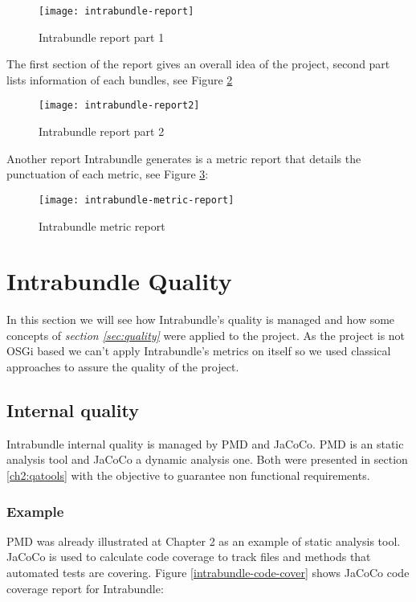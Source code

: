 \begin{figure}[h]
\caption{Intrabundle report part 1}
\label{intrabundle-report1}
\centering
\texttt{[image: intrabundle-report]}
\end{figure}  
\FloatBarrier

The first section of the report gives an overall idea of the project, second part lists information of each bundles, see Figure \ref{intrabundle-report2} 

\begin{figure}[h]
\caption{Intrabundle report part 2}
\label{intrabundle-report2}
\centering
\texttt{[image: intrabundle-report2]}
\end{figure}  
\FloatBarrier

Another report Intrabundle generates is a metric report that details the punctuation of each metric, see Figure \ref{intrabundle-metric-report}:  

\begin{figure}[h]
\caption{Intrabundle metric report}
\label{intrabundle-metric-report}
\centering
\texttt{[image: intrabundle-metric-report]}
\end{figure}  
\FloatBarrier

\section{Intrabundle Quality}
In this section we will see how Intrabundle's quality is managed and how some concepts of \textit{section \ref{sec:quality}} were applied to the project. As the project is not OSGi based we can't apply Intrabundle's metrics on itself so we used classical approaches to assure the quality of the project.

\subsection{Internal quality}
Intrabundle internal quality is managed by PMD and JaCoCo. PMD is an static analysis tool and JaCoCo a dynamic analysis one. Both were presented in section \ref{ch2:qatools} with the objective to guarantee non functional requirements.

\subsubsection{Example}
 PMD was already illustrated at Chapter 2 as an example of static analysis tool. JaCoCo is used to calculate code coverage to track files and methods that automated tests are covering. Figure \ref{intrabundle-code-cover} shows JaCoCo code coverage report for Intrabundle:

